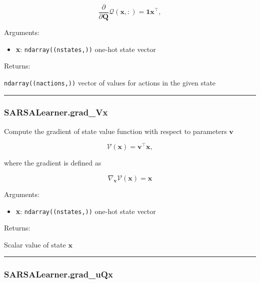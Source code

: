 \[
\frac{\partial}{\partial \mathbf Q} \mathcal Q(\mathbf x, :) = \mathbf 1 \mathbf x^\top,
\]

Arguments:

\begin{itemize}
\tightlist
\item
  \textbf{x}: \texttt{ndarray((nstates,))} one-hot state vector
\end{itemize}

Returns:

\texttt{ndarray((nactions,))} vector of values for actions in the given
state

\begin{center}\rule{0.5\linewidth}{\linethickness}\end{center}

\subsubsection{SARSALearner.grad\_Vx}\label{sarsalearner.grad_vx}

\begin{Shaded}
\begin{Highlighting}[]
\end{Highlighting}
\end{Shaded}

Compute the gradient of state value function with respect to parameters
\(\mathbf v\)

\[
\mathcal V(\mathbf x) = \mathbf v^\top \mathbf x,
\]

where the gradient is defined as

\[
\nabla_{\mathbf v} \mathcal V(\mathbf x) = \mathbf x
\]

Arguments:

\begin{itemize}
\tightlist
\item
  \textbf{x}: \texttt{ndarray((nstates,))} one-hot state vector
\end{itemize}

Returns:

Scalar value of state \(\mathbf x\)

\begin{center}\rule{0.5\linewidth}{\linethickness}\end{center}

\subsubsection{SARSALearner.grad\_uQx}\label{sarsalearner.grad_uqx}


